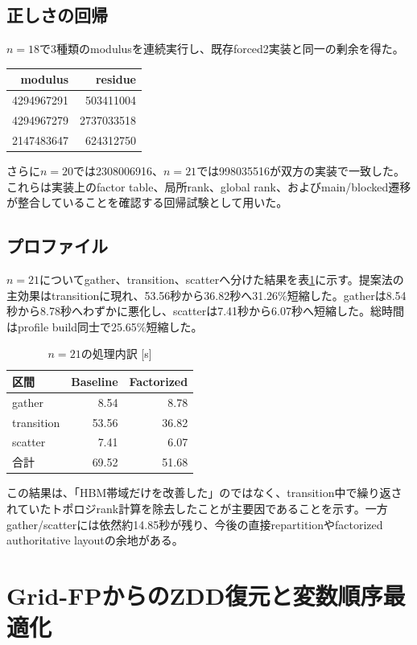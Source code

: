 \documentclass[a4paper,10pt,twocolumn]{ltjsarticle}
\begin{document}
\subsection{正しさの回帰}
$n=18$で3種類のmodulusを連続実行し、既存forced2実装と同一の剰余を得た。
\begin{center}
\begin{tabular}{rr}
\toprule
modulus & residue\\
\midrule
4294967291 & 503411004\\
4294967279 & 2737033518\\
2147483647 & 624312750\\
\bottomrule
\end{tabular}
\end{center}
さらに$n=20$では2308006916、$n=21$では998035516が双方の実装で一致した。これらは実装上のfactor table、局所rank、global rank、およびmain/blocked遷移が整合していることを確認する回帰試験として用いた。

\subsection{プロファイル}
$n=21$についてgather、transition、scatterへ分けた結果を表\ref{tab:profile}に示す。提案法の主効果はtransitionに現れ、53.56秒から36.82秒へ31.26\%短縮した。gatherは8.54秒から8.78秒へわずかに悪化し、scatterは7.41秒から6.07秒へ短縮した。総時間はprofile build同士で25.65\%短縮した。

\begin{table}[t]
\centering
\caption{$n=21$の処理内訳 [s]}
\label{tab:profile}
\begin{tabular}{lrr}
\toprule
区間 & Baseline & Factorized\\
\midrule
gather & 8.54 & 8.78\\
transition & 53.56 & 36.82\\
scatter & 7.41 & 6.07\\
\midrule
合計 & 69.52 & 51.68\\
\bottomrule
\end{tabular}
\end{table}

この結果は、「HBM帯域だけを改善した」のではなく、transition中で繰り返されていたトポロジrank計算を除去したことが主要因であることを示す。一方gather/scatterには依然約14.85秒が残り、今後の直接repartitionやfactorized authoritative layoutの余地がある。



\section{Grid-FPからのZDD復元と変数順序最適化}
\end{document}
